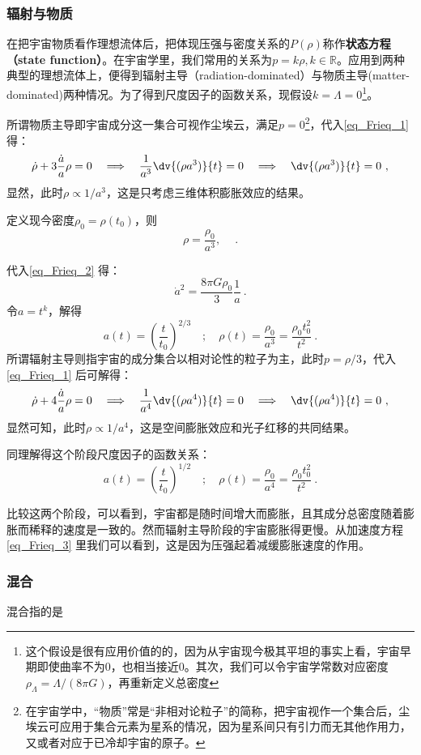 \subsubsection{辐射与物质}
在把宇宙物质看作理想流体后，把体现压强与密度关系的$P(\rho)$称作\textbf{状态方程（state function）}。在宇宙学里，我们常用的关系为$p=k\rho,k\in \mathbb R$。应用到两种典型的理想流体上，便得到辐射主导（radiation-dominated）与物质主导(matter-dominated)两种情况。为了得到尺度因子的函数关系，现假设$k=\Lambda=0$\footnote{这个假设是很有应用价值的的，因为从宇宙现今极其平坦的事实上看，宇宙早期即使曲率不为0，也相当接近0。其次，我们可以令宇宙学常数对应密度$\rho_{\Lambda}=\Lambda/(8\pi G)$，再重新定义总密度}。

所谓物质主导即宇宙成分这一集合可视作尘埃云，满足$p=0$\footnote{在宇宙学中，“物质”常是“非相对论粒子”的简称，把宇宙视作一个集合后，尘埃云可应用于集合元素为星系的情况，因为星系间只有引力而无其他作用力，又或者对应于已冷却宇宙的原子。}，代入\autoref{eq_Frieq_1} 得：
\begin{equation}\dot{\rho}+3\frac{\dot{a}}{a}\rho=0\quad\Longrightarrow\quad\frac1{a^3}\dv{(\rho a^3)}{t}=0\quad\Longrightarrow\quad\dv{(\rho a^3)}{t}=0 ~,\end{equation}
显然，此时$\rho\propto 1/a^3$，这是只考虑三维体积膨胀效应的结果。

定义现今密度$\rho_0=\rho(t_0)$，则
\begin{equation}
\rho=\frac{\rho_0}{a^3},\quad ~.
\end{equation}

代入\autoref{eq_Frieq_2} 得：
\begin{equation}
\dot{a}^2=\frac{8\pi G\rho_0}3\frac1a ~.
\end{equation}
令$a=t^k$，解得
\begin{equation}a(t)=\left(\frac{t}{t_0}\right)^{2/3}\quad;\quad\rho(t)=\frac{\rho_0}{a^3}=\frac{\rho_0t_0^2}{t^2}~.\end{equation}
所谓辐射主导则指宇宙的成分集合以相对论性的粒子为主，此时$p=\rho/3$，代入\autoref{eq_Frieq_1} 后可解得：
\begin{equation}\dot{\rho}+4\frac{\dot{a}}{a}\rho=0\quad\Longrightarrow\quad\frac1{a^4}\dv{(\rho a^4)}{t}=0\quad\Longrightarrow\quad\dv{(\rho a^4)}{t} =0~,\end{equation}
显然可知，此时$\rho\propto  1/a^4$，这是空间膨胀效应和光子红移的共同结果。

同理解得这个阶段尺度因子的函数关系：
\begin{equation}
a(t)=\left(\frac{t}{t_0}\right)^{1/2}\quad;\quad\rho(t)=\frac{\rho_0}{a^4}=\frac{\rho_0t_0^2}{t^2} ~.
\end{equation}

比较这两个阶段，可以看到，宇宙都是随时间增大而膨胀，且其成分总密度随着膨胀而稀释的速度是一致的。然而辐射主导阶段的宇宙膨胀得更慢。从加速度方程\autoref{eq_Frieq_3} 里我们可以看到，这是因为压强起着减缓膨胀速度的作用。
\subsubsection{混合}

混合指的是